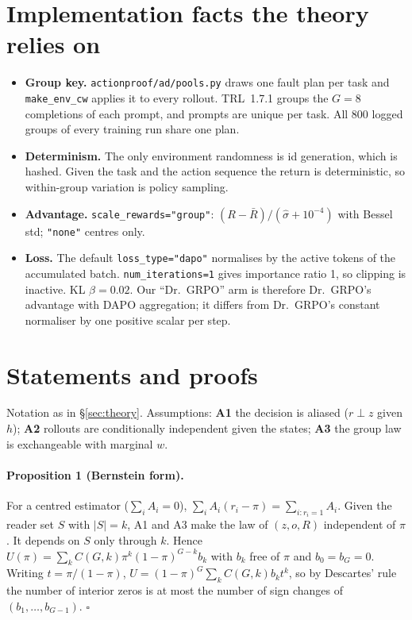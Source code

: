 \section{Implementation facts the theory relies on}\label{app3:impl}
\begin{itemize}
\item \textbf{Group key.} \texttt{actionproof/ad/pools.py} draws one fault plan per task and \texttt{make\_env\_cw}
applies it to every rollout. TRL~1.7.1 groups the $G{=}8$ completions of each prompt, and prompts are unique per task.
All 800 logged groups of every training run share one plan.
\item \textbf{Determinism.} The only environment randomness is id generation, which is hashed. Given the task and the
action sequence the return is deterministic, so within-group variation is policy sampling.
\item \textbf{Advantage.} \texttt{scale\_rewards="group"}: $(R-\bar R)/(\hat\sigma+10^{-4})$ with Bessel std;
\texttt{"none"} centres only.
\item \textbf{Loss.} The default \texttt{loss\_type="dapo"} normalises by the active tokens of the accumulated batch.
\texttt{num\_iterations=1} gives importance ratio 1, so clipping is inactive. KL $\beta=0.02$. Our ``Dr.~GRPO'' arm is
therefore Dr.~GRPO's advantage with DAPO aggregation; it differs from Dr.~GRPO's constant normaliser by one positive
scalar per step.
\end{itemize}

\section{Statements and proofs}\label{app3:proofs}
Notation as in \S\ref{sec:theory}. Assumptions:
\textbf{A1} the decision is aliased ($r\perp z$ given $h$);
\textbf{A2} rollouts are conditionally independent given the states;
\textbf{A3} the group law is exchangeable with marginal $w$.

\paragraph{Proposition 1 (Bernstein form).} For a centred estimator ($\sum_iA_i=0$),
$\sum_iA_i(r_i-\pi)=\sum_{i:r_i=1}A_i$. Given the reader set $S$ with $|S|=k$, A1 and A3 make the law of
$(z,o,R)$ independent of $\pi$. It depends on $S$ only through $k$. Hence
$U(\pi)=\sum_kC(G,k)\pi^k(1-\pi)^{G-k}b_k$ with $b_k$ free of $\pi$ and $b_0=b_G=0$. Writing $t=\pi/(1-\pi)$,
$U=(1-\pi)^G\sum_kC(G,k)b_kt^k$, so by Descartes' rule the number of interior zeros is at most the number of sign
changes of $(b_1,\dots,b_{G-1})$. $\square$

